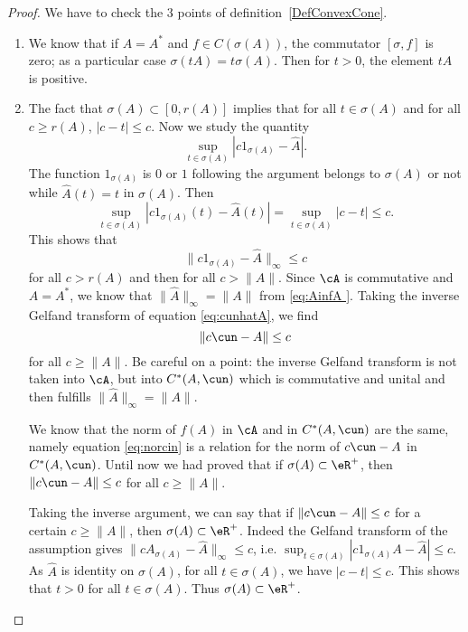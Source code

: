 \begin{proof}

	We have to check the \(3\) points of definition~\ref{DefConvexCone}.
	\begin{enumerate}
		\item

		      We know that if $A=A^*$ and $f\in C(\sigma(A))$, the commutator $[\sigma,f]$ is zero; as a particular case $\sigma(tA)=t\sigma(A)$. Then for $t>0$, the element $tA$ is positive.

		\item

		      The fact that $\sigma(A)\subset [0,r(A)]$ implies that for all $t\in\sigma(A)$ and for all $c\geq r(A)$,  $| c-t |\leq c$. Now we study the quantity
		      \[
			      \sup_{t\in \sigma(A)}| c1_{\sigma(A)}-\hat A |.
		      \]
		      The function $1_{\sigma(A)}$ is $0$ or $1$ following the argument belongs to $\sigma(A)$ or not while $\hat A(t)=t$ in $\sigma(A)$. Then
		      \[
			      \sup_{t\in\sigma(A)}| c1_{\sigma(A)}(t)-\hat A(t) |=\sup_{t\in\sigma(A)}| c-t |\leq c.
		      \]
		      This shows that
		      \begin{equation} \label{eq:cunhatA}
			      \| c1_{\sigma(A)}-\hat A \|_{\infty}\leq c
		      \end{equation}
		      for all $c>r(A)$ and then for all $c>\| A \|$. Since $\cA$ is commutative and $A=A^*$, we know that $\| \hat A \|_{\infty}=\| A \|$ from  \eqref{eq:AinfA }. Taking the inverse Gelfand transform of equation \eqref{eq:cunhatA}, we find
		      \begin{equation} \label{eq:norcin}
			      \| c\cun-A \|\leq c
		      \end{equation}
		      for all $c\geq\| A \|$. Be careful on a point: the inverse Gelfand transform is not taken into $\cA$, but into $C^*(A,\cun)$ which is commutative and unital and then fulfills $\| \hat A \|_{\infty}=\| A \|$.

		      We know that the norm of $f(A)$ in $\cA$ and in $C^*(A,\cun)$ are the same, namely equation \eqref{eq:norcin} is a relation for the norm of $c\cun-A$ in $C^*(A,\cun)$. Until now we had proved that if $\sigma(A)\subset\eR^+$, then $\| c\cun-A \|\leq c$ for all $c\geq\| A \|$.

		      Taking the inverse argument, we can say that if $\| c\cun-A \|\leq c$ for a certain $c\geq\| A \|$, then $\sigma(A)\subset\eR^+$. Indeed the Gelfand transform of the assumption gives $\| cA_{\sigma(A)}-\hat A \|_{\infty}\leq c$, i.e. $\sup_{t\in\sigma(A)}| c1_{\sigma(A)}A-\hat A |\leq c$. As $\hat A$ is identity on $\sigma(A)$, for all $t\in\sigma(A)$, we have $| c-t |\leq c$. This shows that $t>0$ for all $t\in\sigma(A)$. Thus $\sigma(A)\subset\eR^+$.


\end{enumerate}
\end{proof}
